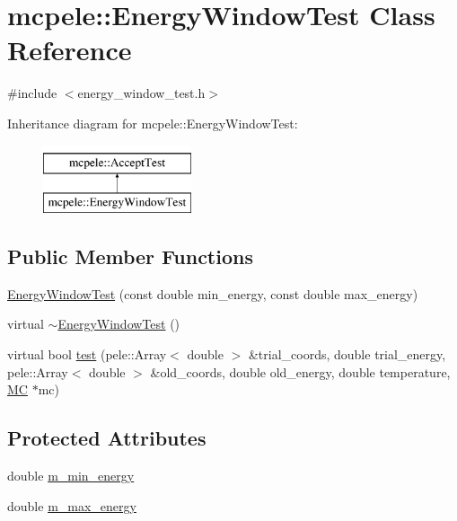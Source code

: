 \hypertarget{classmcpele_1_1EnergyWindowTest}{\section{mcpele\-:\-:\-Energy\-Window\-Test \-Class \-Reference}
\label{classmcpele_1_1EnergyWindowTest}
}


{\ttfamily \#include $<$energy\-\_\-window\-\_\-test.\-h$>$}

\-Inheritance diagram for mcpele\-:\-:\-Energy\-Window\-Test\-:\begin{figure}[H]
\begin{center}
\leavevmode
\includegraphics[height=2.000000cm]{classmcpele_1_1EnergyWindowTest}
\end{center}
\end{figure}
\subsection*{\-Public \-Member \-Functions}
\begin{DoxyCompactItemize}
\item 
\hyperlink{classmcpele_1_1EnergyWindowTest_a0b8f02bf14f23525e1661729864d8e70}{\-Energy\-Window\-Test} (const double min\-\_\-energy, const double max\-\_\-energy)
\item 
virtual \hyperlink{classmcpele_1_1EnergyWindowTest_ad0e1111aaf29e6c462451d7708722c52}{$\sim$\-Energy\-Window\-Test} ()
\item 
virtual bool \hyperlink{classmcpele_1_1EnergyWindowTest_a529460eac573357f981639fe85807520}{test} (pele\-::\-Array$<$ double $>$ \&trial\-\_\-coords, double trial\-\_\-energy, pele\-::\-Array$<$ double $>$ \&old\-\_\-coords, double old\-\_\-energy, double temperature, \hyperlink{classmcpele_1_1MC}{\-M\-C} $\ast$mc)
\end{DoxyCompactItemize}
\subsection*{\-Protected \-Attributes}
\begin{DoxyCompactItemize}
\item 
double \hyperlink{classmcpele_1_1EnergyWindowTest_abb86cad9952f92fd8db221baaf62e847}{m\-\_\-min\-\_\-energy}
\item 
double \hyperlink{classmcpele_1_1EnergyWindowTest_ae0db5a8b295b8bf29477fd5dd741a88c}{m\-\_\-max\-\_\-energy}
\end{DoxyCompactItemize}


